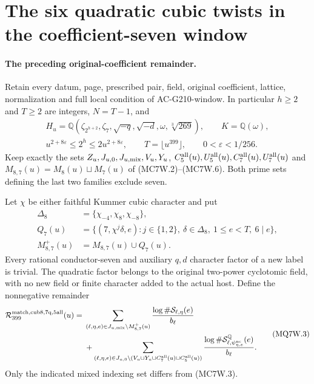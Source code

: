 \section{The six quadratic cubic twists in the coefficient-seven window}
\label{sec:mixed-cubic-quadratic-seven-window}

\paragraph{The preceding original-coefficient remainder.}
Retain every datum, page, prescribed pair, field, original coefficient,
lattice, normalization and full local condition of AC-G210-window.
In particular $h\geq2$ and $T\geq2$ are integers, $N=T-1$, and
\[
 \begin{gathered}
 H_u=\mathbb Q(\zeta_{2^{h+2}},\zeta_7,\sqrt{-q},\sqrt{-d},
                   \omega,\sqrt[3]{269}),\qquad K=\mathbb Q(\omega),\\
 u^{2+8\varepsilon}\leq2^h\leq2u^{2+8\varepsilon},\qquad
 T=\lfloor u^{399}\rfloor,\qquad0<\varepsilon<1/256.
 \end{gathered}\tag{MQ7W.1}
\]
Keep exactly the sets $Z_u,J_{u,0},J_{u,\rm mix},V_u,Y_u$,
$C_5^{\rm all}(u),U_5^{\rm all}(u),C_7^{\rm all}(u),U_7^{\rm all}(u)$
and $M_{8,7}(u)=M_8(u)\sqcup M_7(u)$ of (MC7W.2)--(MC7W.6).
Both prime sets defining the last two families exclude seven.

Let $\chi$ be either faithful Kummer cubic character and put
\[
 \begin{split}
 \Delta_8&=\{\chi_{-4},\chi_8,\chi_{-8}\},\\
 Q_7(u)&=\{(7,\chi^j\delta,e):j\in\{1,2\},\ \delta\in\Delta_8,
                           \ 1\leq e<T,\ 6\mid e\},\\
 M_{8,7}^{+}(u)&=M_{8,7}(u)\cup Q_7(u).
 \end{split}\tag{MQ7W.2}
\]
Every rational conductor-seven and auxiliary $q,d$ character
factor of a new label is trivial. The quadratic factor belongs
to the original two-power cyclotomic field, with no new field
or finite character added to the actual host.
Define the nonnegative remainder
\[
 \begin{split}
 \mathcal R_{399}^{\rm match,cub8,7q,5all}(u)={}&
  \sum_{(\ell,\eta,e)\in J_{u,\rm mix}\setminus M_{8,7}^{+}(u)}
                  \frac{\log\#\mathcal S_{\ell,\eta}(e)}{b_\ell}\\
 &+\sum_{(\ell,\eta,e)\in
       J_{u,0}\setminus(V_u\cup Y_u\cup C_7^{\rm all}(u)
                                         \cup C_5^{\rm all}(u))}
       \frac{\log\#\mathcal S^{\mathbb Q}_{\ell,
                             \psi_{\eta,e}^{\rm nc}}(e)}{b_\ell}.
 \end{split}\tag{MQ7W.3}
\]
Only the indicated mixed indexing set differs from (MC7W.3).

